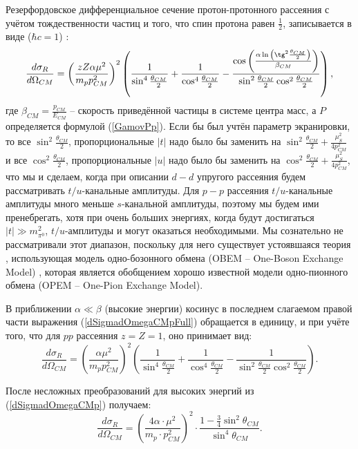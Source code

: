 \documentclass[a4paper,12pt]{article}
\begin{document}
\begin{large}
Резерфордовское дифференциальное сечение протон-протонного рассеяния с учётом тождественности частиц и того, что спин протона равен $\frac{1}{2}$, записывается в виде ($\hbar c=1$)  \cite{LandauLifshitzNonrelativisticQM}:
\begin{equation}
  \label{dSigmadOmegaCMpFull}
  \frac{d\sigma_R}{d\Omega_{CM}}=\left( \frac{zZ \alpha\mu^2}{m_p p_{CM}^2} \right)^2\left( \frac{1}{\sin^4{\frac{\theta_{CM}}{2}}} + \frac{1}{\cos^4{\frac{\theta_{CM}}{2}}} - \frac{\cos{\left( \frac{\alpha\ln{ \left( \tg^2{\frac{\theta_{CM}}{2}} \right)}}{\beta_{CM}}\right)}}{\sin^2{\frac{\theta_{CM}}{2}}\cos^2{\frac{\theta_{CM}}{2}}}\right),
\end{equation}
где $\beta_{CM}=\frac{p_{CM}}{E_{CM}}$ -- скорость приведённой частицы в системе центра масс, а $P$ определяется формулой (\ref{GamovPp}).
  Если бы был учтён параметр экранировки, то все $\sin^2{\frac{\theta_{CM}}{2}}$, пропорциональные $|t|$ надо было бы заменить на $\sin^2{\frac{\theta_{CM}}{2}}+\frac{\mu^2_S}{4p^2_{CM}}$ и все $\cos^2{\frac{\theta_{CM}}{2}}$, пропорциональные $|u|$ надо было бы заменить на $\cos^2{\frac{\theta_{CM}}{2}}+\frac{\mu^2_S}{4p^2_{CM}}$, что мы и сделаем, когда при описании $d-d$ упругого рассеяния будем рассматривать $t/u$-канальные амплитуды.
  Для $p-p$ рассеяния $t/u$-канальные амплитуды много меньше $s$-канальной амплитуды, поэтому мы будем ими пренебрегать, хотя при очень больших энергиях, когда будут достигаться $|t|\gg m^2_{\pi^0}$, $t/u$-амплитуды и могут оказаться необходимыми.
  Мы сознательно не рассматривали этот диапазон, поскольку для него существует устоявшаяся теория \cite{Norman09}, использующая модель одно-бозонного обмена (OBEM -- One-Boson Exchange Model) \cite{OBEM}, которая является обобщением хорошо известной модели одно-пионного обмена (OPEM -- One-Pion Exchange Model).

В приближении $\alpha \ll \beta$ (высокие энергии) косинус в последнем слагаемом правой части выражения (\ref{dSigmadOmegaCMpFull}) обращается в единицу, и при учёте того, что для $pp$ рассеяния $z=Z=1$, оно принимает вид:
\begin{equation}
  \label{dSigmadOmegaCMp}
\frac{d\sigma_R}{d\Omega_{CM}}=\left( \frac{\alpha\mu^2}{m_p p_{CM}^2} \right)^2 \left( \frac{1}{\sin^4{\frac{\theta_{CM}}{2}}} + \frac{1}{\cos^4{\frac{\theta_{CM}}{2}}} - \frac{1}{\sin^2{\frac{\theta_{CM}}{2}}\cos^2{\frac{\theta_{CM}}{2}}} \right).
\end{equation}

После несложных преобразований для высоких энергий из (\ref{dSigmadOmegaCMp}) получаем:
\begin{equation}
  \label{dSigmadOmegaSimplep}
\frac{d\sigma_R}{d\Omega_{CM}}=\left( \frac{4 \alpha \cdot \mu^2}{m_p \cdot p_{CM}^2} \right)^2 \cdot \frac{1-\frac{3}{4} \sin^2{\theta_{CM}}}{\sin^4{\theta_{CM}}}.
\end{equation}


\end{large}
\end{document}

